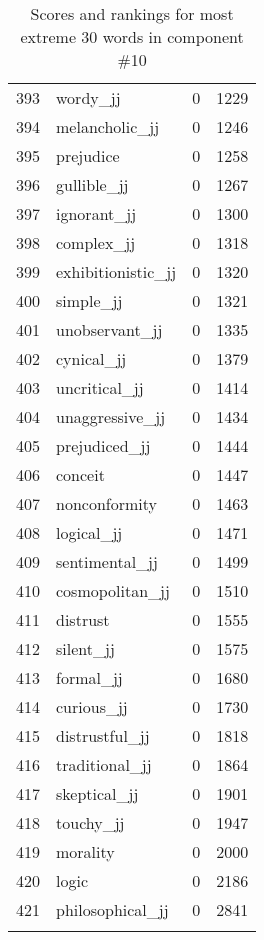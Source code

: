 \begin{longtable}[!htbp]{| rlr@{.}l |}
    393 & wordy\_jj & 0 & 1229 \\
    394 & melancholic\_jj & 0 & 1246 \\
    395 & prejudice & 0 & 1258 \\
    396 & gullible\_jj & 0 & 1267 \\
    397 & ignorant\_jj & 0 & 1300 \\
    398 & complex\_jj & 0 & 1318 \\
    399 & exhibitionistic\_jj & 0 & 1320 \\
    400 & simple\_jj & 0 & 1321 \\
    401 & unobservant\_jj & 0 & 1335 \\
    402 & cynical\_jj & 0 & 1379 \\
    403 & uncritical\_jj & 0 & 1414 \\
    404 & unaggressive\_jj & 0 & 1434 \\
    405 & prejudiced\_jj & 0 & 1444 \\
    406 & conceit & 0 & 1447 \\
    407 & nonconformity & 0 & 1463 \\
    408 & logical\_jj & 0 & 1471 \\
    409 & sentimental\_jj & 0 & 1499 \\
    410 & cosmopolitan\_jj & 0 & 1510 \\
    411 & distrust & 0 & 1555 \\
    412 & silent\_jj & 0 & 1575 \\
    413 & formal\_jj & 0 & 1680 \\
    414 & curious\_jj & 0 & 1730 \\
    415 & distrustful\_jj & 0 & 1818 \\
    416 & traditional\_jj & 0 & 1864 \\
    417 & skeptical\_jj & 0 & 1901 \\
    418 & touchy\_jj & 0 & 1947 \\
    419 & morality & 0 & 2000 \\
    420 & logic & 0 & 2186 \\
    421 & philosophical\_jj & 0 & 2841 \\
    \hline
    \caption{Scores and rankings for most extreme 30 words in component \#10} \\
\end{longtable}
